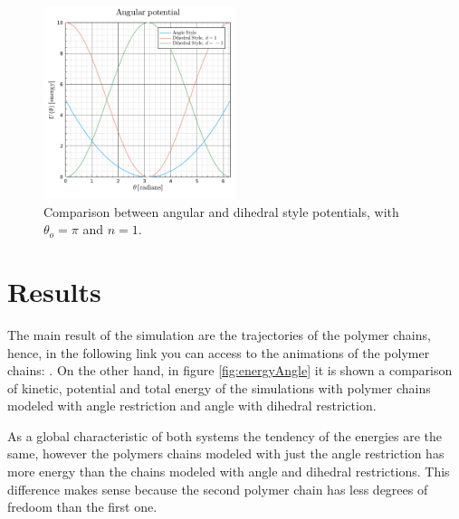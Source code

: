 \documentclass[main.tex]{subfiles}
\begin{document}
\begin{figure}[ht!]
    \centering
    \includegraphics[width=0.5\textwidth]{imgs/hw4/angularPotential.pdf}
    \caption{
        Comparison between angular and dihedral style potentials, with $\theta_{o} = \pi$ and $n = 1$.
        }
    \label{fig:angularPotentials}
\end{figure}

\section{Results}

The main result of the simulation are the trajectories of the polymer chains, hence, in the following link you can access to the animations of the polymer chains:
\href{https://tecmx-my.sharepoint.com/:f:/g/personal/a00827546_tec_mx/Em7ZRtUwkWFJq2eKKiTQE4gBxVktk2Dbfr_g3iGSJvc9cw?email=leogabac%40tec.mx&e=myOo80}{\color{blue}{Access to the animation}}.
On the other hand, in figure \ref{fig:energyAngle} it is shown a comparison of kinetic, potential and total energy of the simulations with polymer chains modeled with angle restriction and angle with dihedral restriction.

As a global characteristic of both systems the tendency of the energies are the same, however the polymers chains modeled with just the angle restriction has more energy than the chains modeled with angle and dihedral restrictions.
This difference makes sense because the second polymer chain has less degrees of fredoom than the first one.
\end{document}
